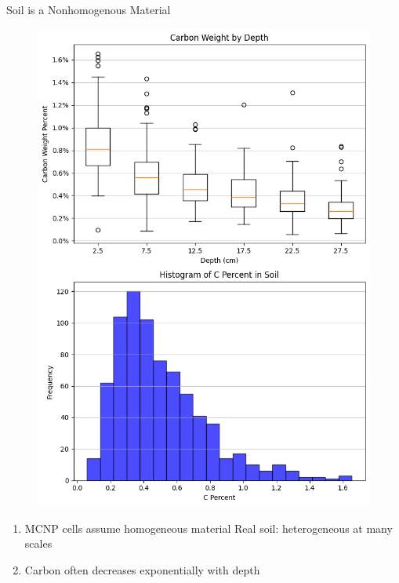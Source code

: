 \documentclass[10pt,hyperref={colorlinks,citecolor=blue,urlcolor=peking_blue,linkcolor=}]{beamer}
\theoremstyle{plain}
\begin{document}
\begin{frame}{Soil is a Nonhomogenous Material}
\begin{figure}[Carbon case study over depth]
\begin{center}
\includegraphics[width=1\linewidth]{../Figures/CaseStudy/depthstudy.png}
\end{center}
\end{figure}
\begin{enumerate}
\item MCNP cells assume homogeneous material
Real soil: heterogeneous at many scales
\item Carbon often decreases exponentially with depth
\end{enumerate}
\end{frame}
\end{document}
